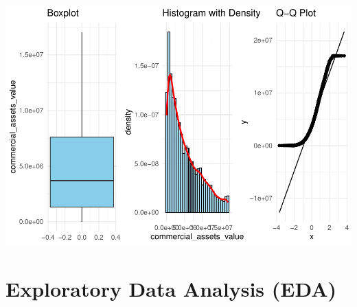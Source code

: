 \documentclass[
]{article}
\begin{document}
\includegraphics{Loan_approval_files/figure-latex/unnamed-chunk-12-1.pdf}

\section{Exploratory Data Analysis
(EDA)}\label{exploratory-data-analysis-eda}
\end{document}
